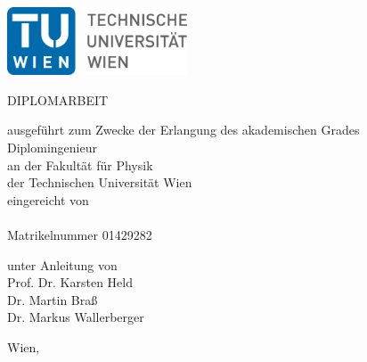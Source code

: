 
\begin{titlepage}
    \begin{center}
        \includegraphics[width=0.4\textwidth]{graphics/figures/logo_tu.pdf}
        \vspace{1.5cm}

        DIPLOMARBEIT

        \vspace{1.5cm}

        {\Huge \textbf{\@title}}

        \vspace{1.5cm}

        ausgeführt zum Zwecke der Erlangung des akademischen Grades\\
        Diplomingenieur\\
        an der Fakultät für Physik\\
        der Technischen Universität Wien\\
        eingereicht von\\
        \@author\\
        Matrikelnummer 01429282\\

    \end{center}

    unter Anleitung von\\
    Prof. Dr. Karsten Held\\
    Dr. Martin Braß\\
    Dr. Markus Wallerberger

    Wien, \@date
\end{titlepage}

